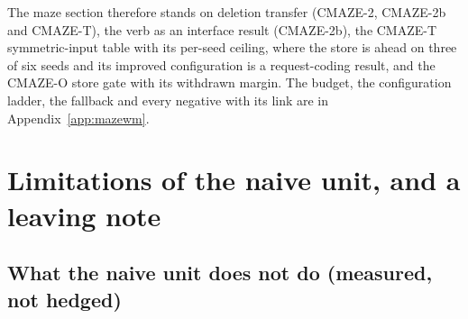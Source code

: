 \documentclass{article} %
\begin{document}
The maze section therefore stands on deletion transfer (CMAZE-2, CMAZE-2b and CMAZE-T), the verb as
an interface result (CMAZE-2b), the CMAZE-T symmetric-input table with its per-seed ceiling, where the
store is ahead on three of six seeds and its improved configuration is a request-coding result, and
the CMAZE-O store gate with its withdrawn margin. The budget, the configuration ladder, the fallback
and every negative with its link are in Appendix~\ref{app:mazewm}.

\section{Limitations of the naive unit, and a leaving note}
\label{sec:limits}

\subsection{What the naive unit does not do (measured, not hedged)}
\label{sec:limits-list}
\end{document}
